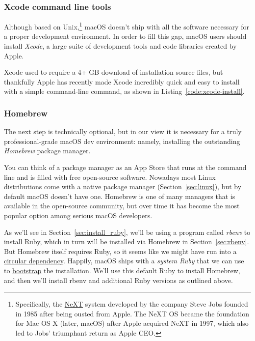 

\subsubsection{Xcode command line tools}
\label{sec:shiny_xcode}

Although based on Unix,\footnote{Specifically, the \href{https://en.wikipedia.org/wiki/NeXT}{NeXT} system developed by the company Steve Jobs founded in 1985 after being ousted from Apple. The NeXT OS became the foundation for Mac OS X (later, macOS) after Apple acquired NeXT in 1997, which also led to Jobs' triumphant return as Apple CEO\@.} macOS doesn't ship with all the software necessary for a proper development environment. In order to fill this gap, macOS users should install \emph{Xcode}, a large suite of development tools and code libraries created by Apple.

Xcode used to require a 4+ GB download of installation source files, but thankfully Apple has recently made Xcode incredibly quick and easy to install with a simple command-line command, as shown in Listing~\ref{code:xcode-install}.

\begin{codelisting}
\label{code:xcode-install}
\end{codelisting}


\subsubsection{Homebrew}
\label{sec:homebrew}

The next step is technically optional, but in our view it is necessary for a truly professional-grade macOS dev environment: namely, installing the outstanding \emph{Homebrew} package manager.

You can think of a package manager as an App Store that runs at the command line and is filled with free open-source software. Nowadays most Linux distributions come with a native package manager (Section~\ref{sec:linux}), but by default macOS doesn't have one. Homebrew is one of many managers that is available in the open-source community, but over time it has become the most popular option among serious macOS developers.

As we'll see in Section~\ref{sec:install_ruby}, we'll be using a program called \emph{rbenv} to install Ruby, which in turn will be installed via Homebrew in Section~\ref{sec:rbenv}. But Homebrew itself requires Ruby, so it seems like we might have run into a \href{https://en.wikipedia.org/wiki/Circular_dependency}{circular dependency}. Happily, macOS ships with a \emph{system Ruby} that we can use to \href{https://en.wikipedia.org/wiki/Bootstrapping}{bootstrap} the installation. We'll use this default Ruby to install Homebrew, and then we'll install rbenv and additional Ruby versions as outlined above.

